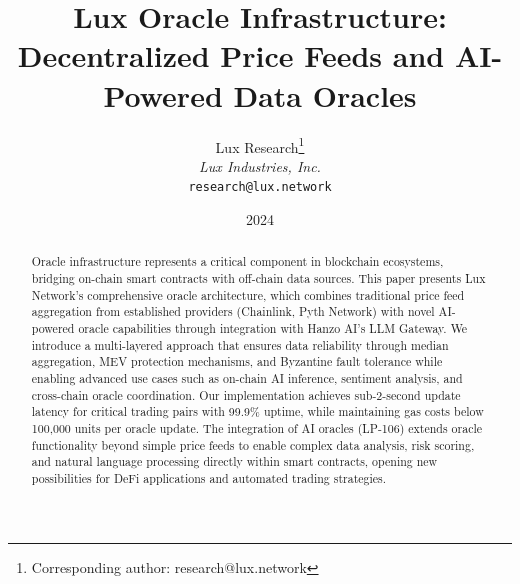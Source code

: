 \documentclass[11pt]{article}
\title{\textbf{Lux Oracle Infrastructure: Decentralized Price Feeds and AI-Powered Data Oracles}}
\author{
Lux Research\thanks{Corresponding author: research@lux.network}\\
\textit{Lux Industries, Inc.}\\
\texttt{research@lux.network}
}
\date{2024}
\begin{document}
\luxcoverpage

\begin{abstract}
Oracle infrastructure represents a critical component in blockchain ecosystems, bridging on-chain smart contracts with off-chain data sources. This paper presents Lux Network's comprehensive oracle architecture, which combines traditional price feed aggregation from established providers (Chainlink, Pyth Network) with novel AI-powered oracle capabilities through integration with Hanzo AI's LLM Gateway. We introduce a multi-layered approach that ensures data reliability through median aggregation, MEV protection mechanisms, and Byzantine fault tolerance while enabling advanced use cases such as on-chain AI inference, sentiment analysis, and cross-chain oracle coordination. Our implementation achieves sub-2-second update latency for critical trading pairs with 99.9\% uptime, while maintaining gas costs below 100,000 units per oracle update. The integration of AI oracles (LP-106) extends oracle functionality beyond simple price feeds to enable complex data analysis, risk scoring, and natural language processing directly within smart contracts, opening new possibilities for DeFi applications and automated trading strategies.
\end{abstract}













\end{document}
